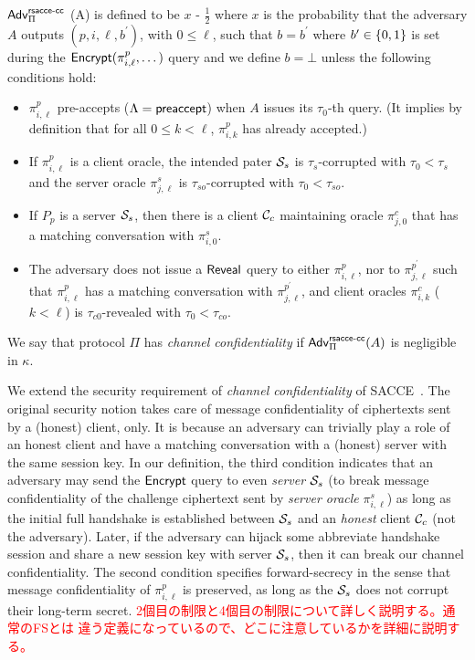 \begin{definition} \label{def:rsacce-cc}
 $\mathsf{Adv}^{\mathsf{rsacce\textsc{-} cc}}_{\Pi}$ (A) is defined to be
 $x$ - $\frac{1}{2}$ where $x$ is the probability that
 the adversary $A$ outputs $(p, i, \ell, b^{\prime})$,
 with $0\leq \ell$, such that $b = b^{\prime}$ where
 $b^{\prime} \in \{0,1\}$ is set during the
 $\mathsf{Encrypt}(\pi^p_{i,\ell},\dots)$ query and we define
 $b=\bot$ unless the following conditions hold:
 \begin{itemize}
  \item{$\pi^p_{i,\ell}$ pre-accepts
  ($\Lambda = \mathsf{preaccept}$) when $A$
  issues its $\tau_0$-th query. (It implies by
  definition that for all $0\leq k < \ell$,
  $\pi^p_{i,k}$ has already accepted.)}

  \item{If $\pi^p_{i,\ell}$ is a client oracle, the
  intended pater $\mathcal{S}_s$ is $\tau_s$-corrupted
  with $\tau_0 < \tau_s$ and the server oracle $\pi^s_{j,\ell}$ is
  $\tau_{so}$-corrupted with $\tau_0 < \tau_{so}$.}

  \item{If $P_p$ is a server $\mathcal{S}_s$, then there
  is a client $\mathcal{C}_c$ maintaining oracle
  $\pi^c_{j,0}$ that has a matching conversation with
  $\pi^s_{i,0}$.}

  \item{The adversary does not issue a $\mathsf{Reveal}$ query
  to either $\pi^p_{i,\ell}$, nor to
  $\pi^{p^{\prime}}_{j,\ell}$ such that $\pi^p_{i,\ell}$
  has a matching conversation with
  $\pi^{p^{\prime}}_{j,\ell}$, and client oracles $\pi^c_{i,k}$
  ($k < \ell$) is $\tau_{c0}$-revealed with $\tau_0 < \tau_{co}$.}
 \end{itemize}
 We say that protocol $\Pi$ has
 \textit{channel confidentiality} if
 $\mathsf{Adv}^{\mathsf{rsacce\textsc{-} cc}}_{\Pi}(A)$ is negligible in $\kappa$.
\end{definition}

\begin{remark}
We extend the security requirement of
\textit{channel confidentiality} of SACCE~\cite{KPW13:SACCE}.
The original security notion takes care of message
confidentiality of ciphertexts sent by a (honest)
client, only. It is because an adversary can trivially
play a role of an honest client and have a matching
conversation with a (honest) server with the same
session key. In our definition, the third condition
indicates that an adversary may send the $\mathsf{Encrypt}$
query to even \textit{server} $\mathcal{S}_s$ (to break
message confidentiality of the challenge ciphertext
sent by \textit{server oracle} $\pi^s_{i,\ell}$) as
long as the initial full handshake is established
between $\mathcal{S}_s$ and an \textit{honest} client
$\mathcal{C}_c$ (not the adversary). Later, if the
adversary can hijack some abbreviate handshake session
and share a new session key with server $\mathcal{S}_s$,
then it can break our channel confidentiality.
The second condition specifies forward-secrecy in the
sense that message confidentiality of $\pi^p_{i,\ell}$
is preserved, as long as the $\mathcal{S}_s$ does not
corrupt their long-term secret.
 \textcolor{red}{
 2個目の制限と4個目の制限について詳しく説明する。通常のFSとは
 違う定義になっているので、どこに注意しているかを詳細に説明する。
 }
\end{remark}

